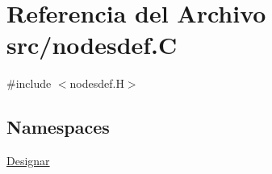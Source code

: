 \hypertarget{nodesdef_8_c}{}\section{Referencia del Archivo src/nodesdef.C}
\label{nodesdef_8_c}
{\ttfamily \#include $<$nodesdef.\+H$>$}\newline
\subsection*{Namespaces}
\begin{DoxyCompactItemize}
\item 
 \hyperlink{namespace_designar}{Designar}
\end{DoxyCompactItemize}

